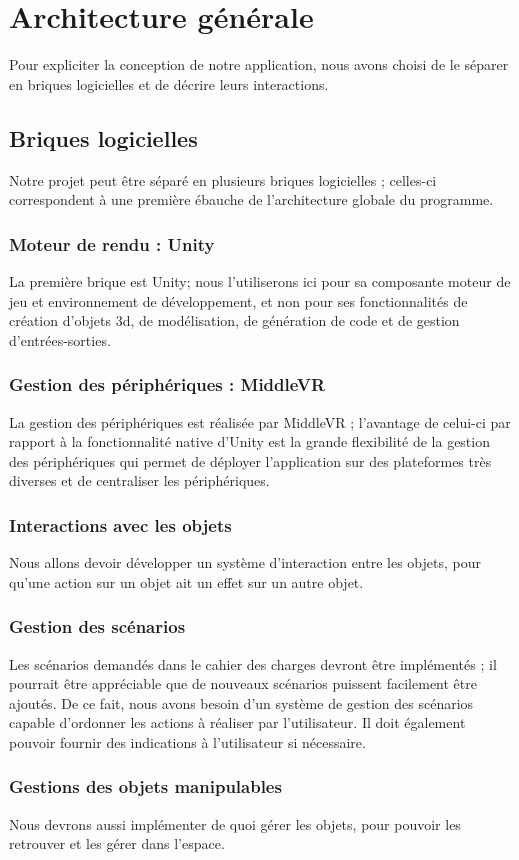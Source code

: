 \section{Architecture générale}
	Pour expliciter la conception de notre application, nous avons choisi de le séparer en briques logicielles et de décrire leurs interactions.
	\subsection{Briques logicielles}
		Notre projet peut être séparé en plusieurs briques logicielles ; celles-ci correspondent à une première ébauche de l'architecture globale du programme.
		\subsubsection{Moteur de rendu : Unity}
			La première brique est Unity; nous l'utiliserons ici pour sa composante moteur de jeu et environnement de développement, et non pour ses fonctionnalités de création d'objets 3d, de modélisation, de génération de code et de gestion d'entrées-sorties.
		\subsubsection{Gestion des périphériques : MiddleVR}
			La gestion des périphériques est réalisée par MiddleVR ; l'avantage de celui-ci par rapport à la fonctionnalité native d'Unity est la grande flexibilité de la gestion des périphériques qui permet de déployer l'application sur des plateformes très diverses et de centraliser les périphériques.
		\subsubsection{Interactions avec les objets}
			Nous allons devoir développer un système d'interaction entre les objets, pour qu'une action sur un objet ait un effet sur un autre objet.
		\subsubsection{Gestion des scénarios}
			Les scénarios demandés dans le cahier des charges devront être implémentés ; il pourrait être appréciable que de nouveaux scénarios puissent facilement être ajoutés.
			De ce fait, nous avons besoin d'un système de gestion des scénarios capable d'ordonner les actions à réaliser par l'utilisateur. Il doit également pouvoir fournir des indications à l'utilisateur si nécessaire.
		\subsubsection{Gestions des objets manipulables}
			Nous devrons aussi implémenter de quoi gérer les objets, pour pouvoir les retrouver et les gérer dans l'espace.
